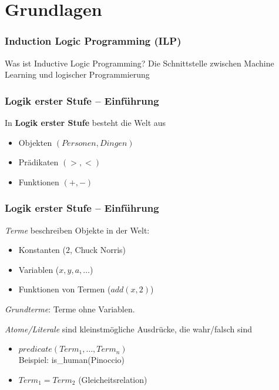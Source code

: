 \section{Grundlagen}

\begin{frame}
	\frametitle{Induction Logic Programming (ILP)}

	\begin{block}{Was ist Inductive Logic Programming?}
			Die Schnittstelle zwischen Machine Learning und logischer Programmierung
	\end{block}
\end{frame}

\begin{frame}
	\frametitle{Logik erster Stufe -- Einführung}

	In \textbf{Logik erster Stufe} besteht die Welt aus
	\begin{itemize}
		\item Objekten  $(Personen, Dingen)$
		\item Prädikaten $(>, <)$
		\item Funktionen $(+, -)$
	\end{itemize}
\end{frame}

\begin{frame}
	\frametitle{Logik erster Stufe -- Einführung}
	\emph{Terme} beschreiben Objekte in der Welt:\\
	\begin{itemize}
		\item Konstanten  ($2$, Chuck Norris)
		\item Variablen   ($x,y, a, \ldots$)
		\item Funktionen von Termen ($add(x,2)$)
	\end{itemize}

	\emph{Grundterme}: Terme ohne Variablen.
	\pause

	\vspace{15pt}
	\emph{Atome/Literale} sind kleinstmögliche Ausdrücke, die wahr/falsch sind
	\begin{itemize}
		\item $predicate(Term_1, \ldots, Term_n)$\\ 
			Beispiel: is\_human(Pinoccio)
		\item $Term_1 = Term_2$ (Gleicheitsrelation)
	\end{itemize}

\end{frame}

